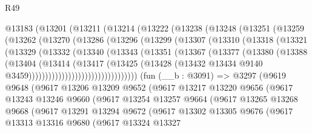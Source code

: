 \begin{lexlean}{R49}
\begin{coremodule}
    @13183
      (@13201
        (@13211
          (@13214
            (@13222
              (@13238
                (@13248
                  (@13251
                    (@13259
                      (@13262
                        (@13270
                          (@13286
                            (@13296
                              (@13299
                                (@13307
                                  (@13310
                                    (@13318
                                      (@13321
                                        (@13329
                                          (@13332
                                            (@13340
                                              (@13343
                                                (@13351
                                                  (@13367
                                                    (@13377
                                                      (@13380
                                                        (@13388
                                                          (@13404
                                                            (@13414
                                                              (@13417
                                                                (@13425
                                                                  (@13428
                                                                    (@13432
                                                                      @13434
                                                                      @9140
                                                                      @3459)))))))))))))))))))))))))))))))))
    (fun (__b : @3091) =>
    @3297
      (@9619
        @9648
        (@9617
          @13206
          @13209
          @9652
          (@9617
            @13217
            @13220
            @9656
            (@9617
              @13243
              @13246
              @9660
              (@9617
                @13254
                @13257
                @9664
                (@9617
                  @13265
                  @13268
                  @9668
                  (@9617
                    @13291
                    @13294
                    @9672
                    (@9617
                      @13302
                      @13305
                      @9676
                      (@9617
                        @13313
                        @13316
                        @9680
                        (@9617
                          @13324
                          @13327

\end{coremodule}
\end{lexlean}
